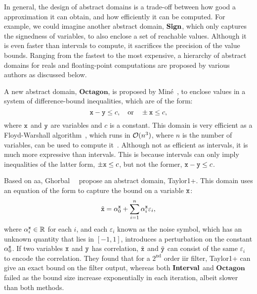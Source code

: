 In general, the design of abstract domains is a trade-off between how good
a approximation it can obtain, and how efficiently it can be computed.  For
example, we could imagine another abstract domain, $\mathbf{Sign}$, which only
captures the signedness of variables, to also enclose a set of reachable
values.  Although it is even faster than intervals to compute, it sacrifices
the precision of the value bounds.  Ranging from the fastest to the most
expensive, a hierarchy of abstract domains for reals and floating-point
computations are proposed by various authors as discussed below.

A new abstract domain, $\mathbf{Octagon}$, is proposed by Min\'e~\cite{mine07},
to enclose values in a system of difference-bound inequalities, which are of
the form:
\begin{equation}
    \texttt{x} - \texttt{y} \leq c, \quad \text{or} \quad
    \pm \texttt{x} \leq c,
\end{equation}
where $\texttt{x}$ and $\texttt{y}$ are variables and $c$ is a constant.  This domain
is very efficient as a Floyd-Warshall algorithm~\cite{floyd62}, which runs in
$\operatorname{\mathcal{O}}(n^3)$, where $n$ is the number of variables, can be used to compute
it~\cite{mine04}.  Although not as efficient as intervals, it is much
more expressive than intervals.  This is because intervals can only imply
inequalities of the latter form, $\pm \texttt{x} \leq c$, but not the former, $\texttt{x}
- \texttt{y} \leq c$.

Based on \gls{aa}, Ghorbal~\etal~\cite{ghorbal09} propose an abstract domain,
Taylor1+\@.  This domain uses an equation of the form to capture the bound on a
variable $\texttt{x}$:
\begin{equation}
    \tilde{\texttt{x}} =
        \alpha^{\texttt{x}}_0 + \sum_{i = 1}^{n} \alpha^{\texttt{x}}_i \varepsilon_i,
\end{equation}
where $\alpha^{\texttt{x}}_i \in \mathbb{R}$ for each $i$, and each $\varepsilon_i$
known as the noise symbol, which has an unknown quantity that lies in
$[-1, 1]$, introduces a perturbation on the constant $\alpha^{\texttt{x}}_0$.
If two variables $\texttt{x}$ and $\texttt{y}$ has correlation, $\tilde{\texttt{x}}$
and $\tilde{\texttt{y}}$ can consist of the same $\varepsilon_i$ to encode
the correlation.  They found that for a $2^\mathrm{nd}$ order \gls{iir}
filter, Taylor1+ can give an exact bound on the filter output, whereas both
$\mathbf{Interval}$ and $\mathbf{Octagon}$ failed as the bound size increase
exponentially in each iteration, albeit slower than both methods.

